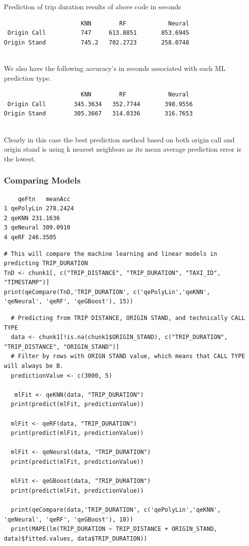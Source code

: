 \documentclass{article}
\numberwithin{equation}{section}
\begin{document}
Prediction of trip duration results of above code in seconds 
\begin{verbatim}
                      KNN        RF            Neural
 Origin Call          747     613.8851       853.6945
Origin Stand          745.2   702.2723       258.0748
 
\end{verbatim}

We also have the following accuracy's in seconds associated with each ML prediction type.  
\begin{verbatim}
                      KNN        RF            Neural
 Origin Call        345.3634   352.7744       398.9556
Origin Stand        305.3667   314.0336       316.7653
 
\end{verbatim}

Clearly in this case the best prediction method based on both origin call and origin stand is using k nearest neighbors as its mean average prediction error is the lowest.

\newpage 

\subsubsection{Comparing Models}

\begin{verbatim}
    qeFtn   meanAcc
1 qePolyLin 278.2424
2 qeKNN 231.1636
3 qeNeural 309.0910
4 qeRF 246.3505
\end{verbatim}

\begin{lstlisting}
# This will compare the machine learning and linear models in predicting TRIP_DURATION
TnD <- chunk1[, c("TRIP_DISTANCE", "TRIP_DURATION", "TAXI_ID", "TIMESTAMP")]
print(qeCompare(TnD,'TRIP_DURATION', c('qePolyLin','qeKNN', 'qeNeural', 'qeRF', 'qeGBoost'), 15))
\end{lstlisting}

\begin{lstlisting}
  # Predicting from TRIP DISTANCE, ORIGIN STAND, and technically CALL TYPE
  data <- chunk1[!is.na(chunk1$ORIGIN_STAND), c("TRIP_DURATION", "TRIP_DISTANCE", "ORIGIN_STAND")]
  # Filter by rows with ORIGN STAND value, which means that CALL TYPE will always be B. 
  predictionValue <- c(3000, 5)
  
   mlFit <- qeKNN(data, "TRIP_DURATION")
  print(predict(mlFit, predictionValue))
  
  mlFit <- qeRF(data, "TRIP_DURATION")
  print(predict(mlFit, predictionValue))
  
  mlFit <- qeNeural(data, "TRIP_DURATION")
  print(predict(mlFit, predictionValue))
  
  mlFit <- qeGBoost(data, "TRIP_DURATION")
  print(predict(mlFit, predictionValue))
  
  print(qeCompare(data,'TRIP_DURATION', c('qePolyLin','qeKNN', 'qeNeural', 'qeRF', 'qeGBoost'), 10))
  print(MAPE(lm(TRIP_DURATION ~ TRIP_DISTANCE + ORIGIN_STAND, data)$fitted.values, data$TRIP_DURATION))
  
\end{lstlisting}
\end{document}
